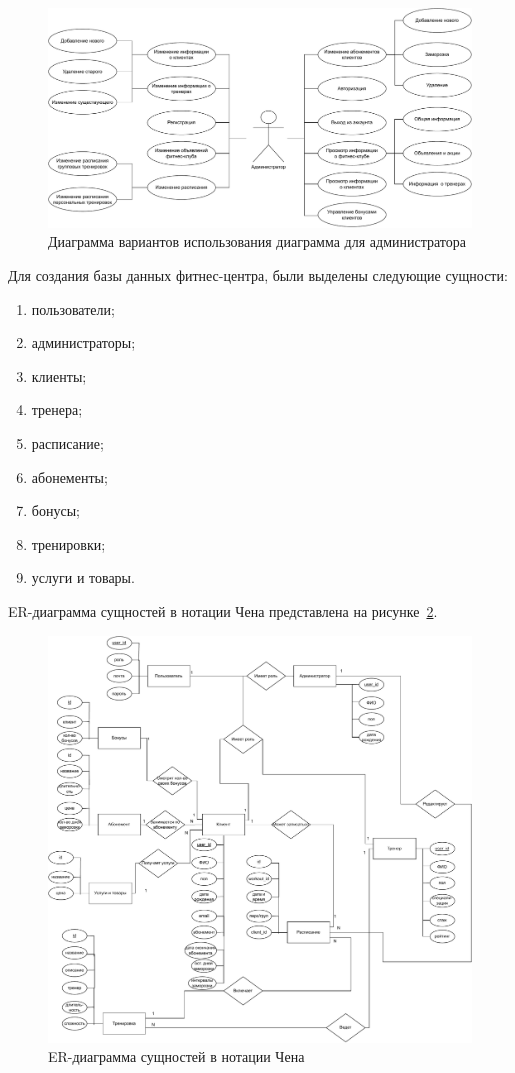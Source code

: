 \begin{figure}[h!]
	\centering
	\includegraphics[width=\linewidth]{img/usecase-admin}
	\caption{Диаграмма вариантов использования диаграмма для администратора}
	\label{fig:usecase_admin}
\end{figure}


Для создания базы данных фитнес-центра, были выделены следующие сущности:
\begin{enumerate}[label=\arabic*)]
	\item пользователи;
	\item администраторы;
	\item клиенты;
	\item тренера;
	\item расписание;
	\item абонементы;
	\item бонусы;
	\item тренировки;
	\item услуги и товары.
\end{enumerate}

ER-диаграмма сущностей в нотации Чена представлена на рисунке~\ref{fig:er}.
\clearpage

\begin{figure}[h!]
	\centering
	\includegraphics[width=\linewidth]{img/er}
	\caption{ER-диаграмма сущностей в нотации Чена}
	\label{fig:er}
\end{figure}


